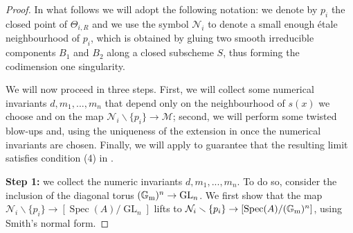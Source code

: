 \documentclass{amsart}
\newcommand{\bG}{\mathbb{G}}
\newcommand{\cM}{\mathcal{M}}
\newcommand{\cN}{\mathcal{N}}
\newcommand{\spec}{\operatorname{Spec}}
\newcommand{\Gm}{\bG_{{\rm m}}}
\newcommand{\GL}{\operatorname{GL}}
\newcommand{\bmu}{\bm{\mu}}
\theoremstyle{definition}
\begin{document}
\begin{proof}
In what follows we will adopt the following notation: we denote by $p_i$ the closed point of $\Theta_{i,R}$ and we use the symbol $\cN_i$ to denote a small enough \'{e}tale neighbourhood of $p_i$, which is obtained by gluing two smooth irreducible components $B_1$ and $B_2$ along a closed subscheme $S$, thus forming the codimension one singularity.

We will now proceed in three steps. First, we will collect some numerical invariants $d,m_1,...,m_n$ that depend only on the neighbourhood of $s(x)$ we choose and on the map $\cN_i\smallsetminus \{p_i\}\to \cM$; second, we will perform some twisted blow-ups and, using the uniqueness of the extension in  once the numerical invariants are chosen. Finally, we will apply  to guarantee that the resulting limit satisfies condition (4) in . 



\textbf{Step 1:} we collect the numeric invariants $d,m_1,...,m_n$. To do so, consider the inclusion of the diagonal torus $(\Gm)^n\to \GL_n$.
We first show that the map $\cN_i\smallsetminus\{p_i\}\to [\spec(A)/\GL_n]$ lifts to $\cN_i\smallsetminus\{p_i\}\to [\spec(A)/(\Gm)^n]$, using Smith's normal form.


\end{proof}
\end{document}
